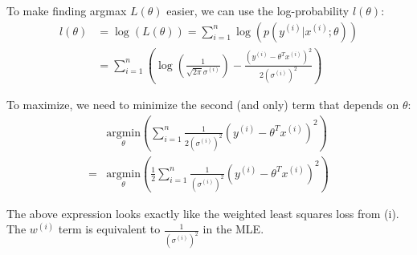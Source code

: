 \begin{answer}
    To make finding argmax $L(\theta)$ easier, we can use the log-probability $l(\theta)$:
    \begin{align*}
    l(\theta) &= \log(L(\theta)) = \sum_{i=1}^{n} \log(p(y^{(i)}|x^{(i)}; \theta)) \\
    &= \sum_{i=1}^{n} \left( \log\left(\frac{1}{\sqrt{2\pi}\sigma^{(i)}}\right) - \frac{(y^{(i)} - \theta^T x^{(i)})^2}{2(\sigma^{(i)})^2} \right)
    \end{align*}

    To maximize, we need to minimize the second (and only) term that depends on \(\theta\):
\begin{align*}
    & \underset{\theta}{\text{argmin}} \left( \sum_{i=1}^{n} \frac{1}{2(\sigma^{(i)})^2} (y^{(i)} - \theta^T x^{(i)})^2 \right) \\
    = & \underset{\theta}{\text{argmin}} \left(\frac{1}{2} \sum_{i=1}^{n} \frac{1}{(\sigma^{(i)})^2} (y^{(i)} - \theta^T x^{(i)})^2 \right)
    \end{align*}

    The above expression looks exactly like the weighted least squares loss from (i).
    The \(w^{(i)}\) term is equivalent to \(\frac{1}{(\sigma^{(i)})^2}\) in the MLE.

\end{answer}
